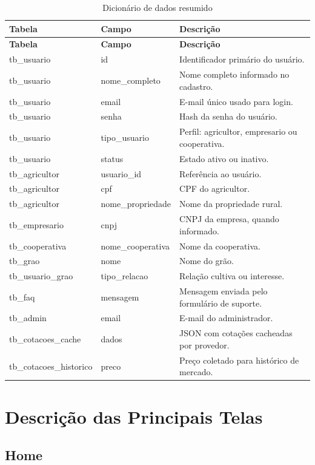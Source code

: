 \documentclass[
  12pt,
  oneside,
  a4paper,
  brazil
]{abntex2}
\begin{document}
\begin{longtable}{@{}p{}p{}p{}@{}}
\caption{Dicionário de dados resumido}\\
\toprule
\textbf{Tabela} & \textbf{Campo} & \textbf{Descrição} \\
\midrule
\endfirsthead
\toprule
\textbf{Tabela} & \textbf{Campo} & \textbf{Descrição} \\
\midrule
\endhead
tb\_usuario & id & Identificador primário do usuário. \\
tb\_usuario & nome\_completo & Nome completo informado no cadastro. \\
tb\_usuario & email & E-mail único usado para login. \\
tb\_usuario & senha & Hash da senha do usuário. \\
tb\_usuario & tipo\_usuario & Perfil: agricultor, empresario ou cooperativa. \\
tb\_usuario & status & Estado ativo ou inativo. \\
tb\_agricultor & usuario\_id & Referência ao usuário. \\
tb\_agricultor & cpf & CPF do agricultor. \\
tb\_agricultor & nome\_propriedade & Nome da propriedade rural. \\
tb\_empresario & cnpj & CNPJ da empresa, quando informado. \\
tb\_cooperativa & nome\_cooperativa & Nome da cooperativa. \\
tb\_grao & nome & Nome do grão. \\
tb\_usuario\_grao & tipo\_relacao & Relação cultiva ou interesse. \\
tb\_faq & mensagem & Mensagem enviada pelo formulário de suporte. \\
tb\_admin & email & E-mail do administrador. \\
tb\_cotacoes\_cache & dados & JSON com cotações cacheadas por provedor. \\
tb\_cotacoes\_historico & preco & Preço coletado para histórico de mercado. \\
\bottomrule
\end{longtable}

\chapter{Descrição das Principais Telas}

\section{Home}
\end{document}
